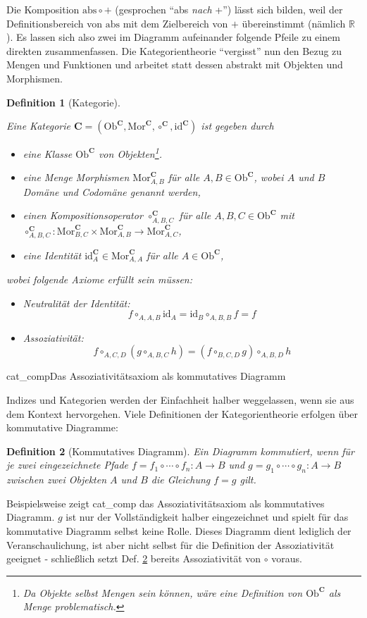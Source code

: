 \documentclass[a4paper, bibgerm]{article}
\newcommand\abb{}
\newcommand\fig{}
\newtheorem{defini}{Definition}
\newcommand{\defi}[2]{%
  \begin{defini}[#1]
    \label{def:#1}
    #2
  \end{defini}
}
\newcommand{\dref}[1]{Def. \ref{def:#1}}
\begin{document}
Die Komposition $\mathrm{abs} \circ +$ (gesprochen "`abs \textit{nach} +"') lässt
sich bilden, weil der Definitionsbereich von $\mathrm{abs}$ mit dem
Zielbereich von $+$ übereinstimmt (nämlich $\mathbb{R}$). Es lassen sich
also zwei im Diagramm aufeinander folgende Pfeile zu einem direkten
zusammenfassen. Die Kategorientheorie "`vergisst"' nun den Bezug zu
Mengen und Funktionen und arbeitet statt dessen abstrakt mit Objekten
und Morphismen.

\defi{Kategorie}{
Eine Kategorie $\mathbf{C} = (\mathrm{Ob}^\mathbf{C}, \mathrm{Mor}^\mathbf{C},
\circ^\mathbf{C}, \mathrm{id}^\mathbf{C})$ ist gegeben durch 
\begin{itemize}
\item eine Klasse $\mathrm{Ob}^\mathbf{C}$ von Objekten\footnote{Da Objekte selbst Mengen
    sein können, wäre eine Definition von $\mathrm{Ob}^\mathbf{C}$ als Menge problematisch.}.
\item eine Menge Morphismen $\mathrm{Mor}^\mathbf{C}_{A,B}$ für alle $ A,B \in
  \mathrm{Ob}^\mathbf{C}$, wobei $A$ und $B$ Domäne und Codomäne genannt werden,
\item einen Kompositionsoperator $\circ^\mathbf{C}_{A,B,C}$ für alle $
  A,B,C \in \mathrm{Ob}^\mathbf{C}$ mit \\
  $\circ^\mathbf{C}_{A,B,C} : \mathrm{Mor}^\mathbf{C}_{B,C} \times
  \mathrm{Mor}^\mathbf{C}_{A,B} \rightarrow \mathrm{Mor}^\mathbf{C}_{A,C}$,
\item eine Identität $\mathrm{id}^\mathbf{C}_A \in \mathrm{Mor}^\mathbf{C}_{A,A}$ für alle $ A \in \mathrm{Ob}^\mathbf{C}$,
\end{itemize}
wobei folgende Axiome erfüllt sein müssen:
\begin{itemize}
\item Neutralität der Identität: $$f \circ_{A,A,B} \mathrm{id}_A = \mathrm{id}_B \circ_{A,B,B} f = f$$
\item Assoziativität:
  $$f \circ_{A,C,D} (g \circ_{A,B,C} h) = (f \circ_{B,C,D} g) \circ_{A,B,D}h$$
\end{itemize}
}

\fig{cat_comp}{Das Assoziativitätsaxiom als kommutatives Diagramm}

Indizes und Kategorien werden der Einfachheit halber weggelassen, wenn
sie aus dem Kontext hervorgehen. Viele Definitionen der
Kategorientheorie erfolgen über kommutative Diagramme:
\defi{Kommutatives Diagramm}{ Ein Diagramm kommutiert, wenn für je zwei
  eingezeichnete Pfade $f=f_1 \circ \cdots \circ f_n : A \rightarrow B$
  und $g=g_1 \circ \cdots \circ g_n : A \rightarrow B$ zwischen zwei
  Objekten $A$ und $B$ die Gleichung $f=g$ gilt.  } 
Beispielsweise zeigt \abb{cat_comp} das Assoziativitätsaxiom als
kommutatives Diagramm. $g$ ist nur der Vollständigkeit halber
eingezeichnet und spielt für das kommutative Diagramm selbst keine
Rolle. Dieses Diagramm dient lediglich der Veranschaulichung, ist aber
nicht selbst für die Definition der Assoziativität geeignet -
schließlich setzt \dref{Kommutatives Diagramm} bereits Assoziativität
von $\circ$ voraus. 
\end{document}
